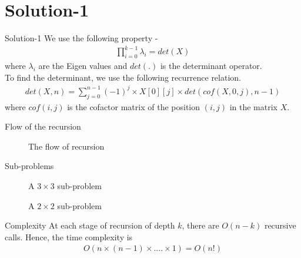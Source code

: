 \section{Solution-1}
\begin{frame}{Solution-1}
    We use the following property -
    \begin{align*}
        \prod_{i = 0}^{k - 1} \lambda_{i} = det(X)
    \end{align*}
    where $\lambda_{i}$ are the Eigen values and $det(.)$ is the determinant operator. \\
    To find the determinant, we use the following recurrence relation.
    \begin{align*}
        det(X, n) = \sum_{j = 0}^{n - 1} (-1) ^ {j} \times X[0][j] \times det(cof(X, 0, j), n - 1)
    \end{align*}
    where $cof(i, j)$ is the cofactor matrix of the position $(i, j)$ in the matrix $X$.
\end{frame}

\begin{frame}{Flow of the recursion}
    \begin{figure}[h!]
	\begin{center}
		\resizebox{\columnwidth/1}{!}{}
	\end{center}
	\caption{The flow of recursion}
	\label{fig:fig1}
\end{figure}
\end{frame}

\begin{frame}{Sub-problems}
    \begin{figure}[h]
    		\resizebox{\columnwidth/2}{!}{}
    	\caption{A $3 \times 3$ sub-problem}
    	\label{fig:fig2}
    \end{figure}
    \begin{figure}[h]
    		\resizebox{\columnwidth/2}{!}{}
    	\caption{A $2 \times 2$ sub-problem}
    	\label{fig:fig3}
    \end{figure}
\end{frame}

\begin{frame}{Complexity}
    At each stage of recursion of depth $k$, there are $O(n - k)$ recursive calls. Hence, the time complexity is 
    \begin{align*}
        O(n \times (n - 1) \times .... \times 1) = O(n!)
    \end{align*}
\end{frame}
